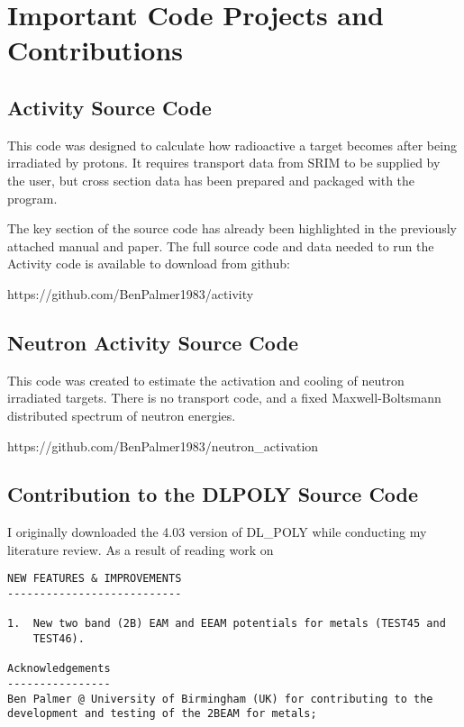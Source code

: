\chapter{Important Code Projects and Contributions}


\section{Activity Source Code}

This code was designed to calculate how radioactive a target becomes after being irradiated by protons.  It requires transport data from SRIM to be supplied by the user, but cross section data has been prepared and packaged with the program.

The key section of the source code has already been highlighted in the previously attached manual and paper.  The full source code and data needed to run the Activity code is available to download from github:

https://github.com/BenPalmer1983/activity



\section{Neutron Activity Source Code}

This code was created to estimate the activation and cooling of neutron irradiated targets.  There is no transport code, and a fixed Maxwell-Boltsmann distributed spectrum of neutron energies.

https://github.com/BenPalmer1983/neutron_activation




\section{Contribution to the DLPOLY Source Code}

I originally downloaded the 4.03 version of DL\_POLY while conducting my literature review.  As a result of reading work on  



\begin{lstlisting}[style=sEmail,caption={Add two numbers function}]
NEW FEATURES & IMPROVEMENTS
---------------------------

1.  New two band (2B) EAM and EEAM potentials for metals (TEST45 and
    TEST46). 

Acknowledgements
----------------
Ben Palmer @ University of Birmingham (UK) for contributing to the
development and testing of the 2BEAM for metals; 

\end{lstlisting}




